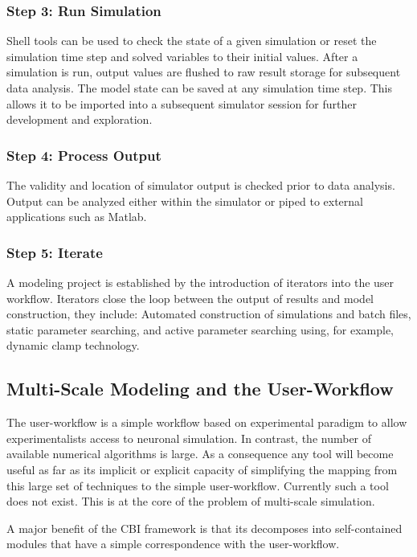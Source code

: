 \documentclass[12pt]{article}
\begin{document}
\subsubsection*{Step 3: Run Simulation}

Shell tools can be used to check the state of a given simulation or reset the simulation time step and solved variables to their initial values. After a simulation is run, output values are flushed to raw result storage for subsequent data analysis. The model state can be saved at any simulation time step. This allows it to be imported into a subsequent simulator session for further development and exploration.

\subsubsection*{Step 4: Process Output}

The validity and location of simulator output is checked prior to data
analysis. Output can be analyzed either within the simulator or piped
to external applications such as
Matlab. %

\subsubsection*{Step 5: Iterate}

A modeling project is established by the introduction of iterators
into the user workflow. Iterators close the loop between the output of
results and model construction, they include: Automated construction
of simulations and batch files, static parameter searching, and active
parameter searching using, for example, dynamic clamp technology.


\subsection*{Multi-Scale Modeling and the User-Workflow}
The user-workflow is a simple workflow based on experimental paradigm
to allow experimentalists access to neuronal simulation.  In contrast,
the number of available numerical algorithms is large.  As a
consequence any tool will become useful as far as its implicit or
explicit capacity of simplifying the mapping from this large set of
techniques to the simple user-workflow.  Currently such a tool does
not exist.  This is at the core of the problem of multi-scale
simulation.

A major benefit of the CBI framework is that its decomposes into
self-contained modules that have a simple correspondence with the
user-workflow.
\end{document}
